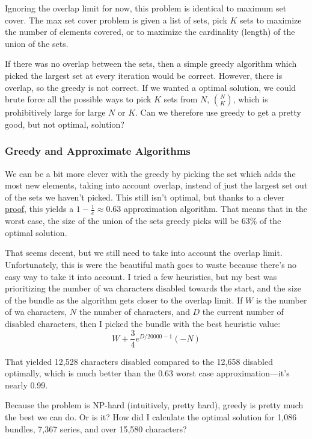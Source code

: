 \documentclass[11pt, oneside]{article}
\theoremstyle{plain}
\theoremstyle{definition}
\begin{document}
Ignoring the overlap limit for now, this problem is identical to maximum set
cover. The max set cover problem is given a list of sets, pick \( K \) sets
to maximize the number of elements covered, or to maximize the cardinality
(length) of the union of the sets.

If there was no overlap between the sets, then a simple greedy algorithm which
picked the largest set at every iteration would be correct. However, there is
overlap, so the greedy is not correct. If we wanted a optimal solution, we
could brute force all the possible ways to pick \( K \) sets from \( N \), \(
N \choose K \), which is prohibitively large for large \( N \) or \( K \). Can
we therefore use greedy to get a pretty good, but not optimal, solution?

\subsubsection{Greedy and Approximate Algorithms}
We can be a bit more clever with the greedy by picking the set
which adds the most new elements, taking into account overlap,
instead of just the largest set out of the sets we haven't picked.
This still isn't optimal, but thanks to a clever
\href{https://people.seas.harvard.edu/~yaron/AM221-S16/lecture_notes/AM221_lecture18.pdf}{proof},
this yields a \( 1 - \frac{1}{e} \approx 0.63 \) approximation
algorithm. That means that in the worst case, the size of the union
of the sets greedy picks will be 63\% of the optimal solution.

That seems decent, but we still need to take into account the overlap limit.
Unfortunately, this is were the beautiful math goes to waste because there's
no easy way to take it into account. I tried a few heuristics, but my best was
prioritizing the number of wa characters disabled towards the start, and the size
of the bundle as the algorithm gets closer to the overlap limit. If \( W \)
is the number of wa characters, \( N \) the number of characters, and \( D \)
the current number of disabled characters, then I picked the bundle with the
best heuristic value:
\[ W + \frac{3}{4} e^{D/20000 - 1}(-N) \]

That yielded 12,528 characters disabled compared to the
12,658 disabled optimally, which is much better than
the 0.63 worst case approximation---it's nearly 0.99.

Because the problem is NP-hard (intuitively, pretty hard), greedy is
pretty much the best we can do. Or is it? How did I calculate the optimal
solution for 1,086 bundles, 7,367 series, and over 15,580 characters?   
\end{document}
